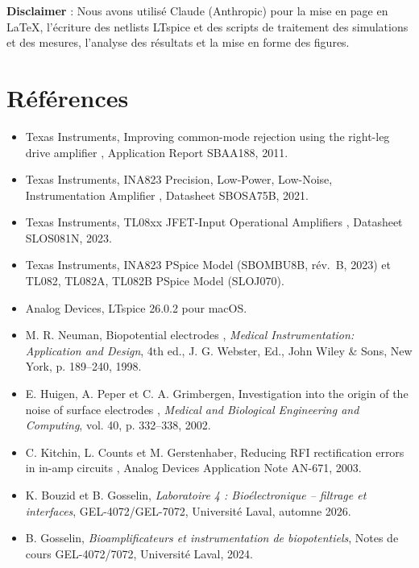 \documentclass[11pt,letterpaper]{article}
\begin{document}
\FloatBarrier
\bigskip
{\small\noindent\textbf{Disclaimer} : Nous avons utilisé Claude (Anthropic) pour la mise en page en \LaTeX{}, l'écriture des netlists LTspice et des scripts de traitement des simulations et des mesures, l'analyse des résultats et la mise en forme des figures.}

\section*{Références}
\begin{itemize}\sloppy
\item Texas Instruments, \og  Improving common-mode rejection using the right-leg drive amplifier \fg{}, Application Report SBAA188, 2011.
\item Texas Instruments, \og  INA823 Precision, Low-Power, Low-Noise, Instrumentation Amplifier \fg{}, Datasheet SBOSA75B, 2021.
\item Texas Instruments, \og  TL08xx JFET-Input Operational Amplifiers \fg{}, Datasheet SLOS081N, 2023.
\item Texas Instruments, \og  INA823 PSpice Model \fg{} (SBOMBU8B, rév.~B, 2023) et \og  TL082, TL082A, TL082B PSpice Model \fg{} (SLOJ070).
\item Analog Devices, LTspice 26.0.2 pour macOS.
\item M. R. Neuman, \og  Biopotential electrodes \fg{}, \emph{Medical Instrumentation: Application and Design}, 4th ed., J. G. Webster, Ed., John Wiley \& Sons, New York, p. 189--240, 1998.
\item E. Huigen, A. Peper et C. A. Grimbergen, \og  Investigation into the origin of the noise of surface electrodes \fg{}, \emph{Medical and Biological Engineering and Computing}, vol. 40, p. 332--338, 2002.
\item C. Kitchin, L. Counts et M. Gerstenhaber, \og  Reducing RFI rectification errors in in-amp circuits \fg{}, Analog Devices Application Note AN-671, 2003.
\item K. Bouzid et B. Gosselin, \emph{Laboratoire 4 : Bioélectronique -- filtrage et interfaces}, GEL-4072/GEL-7072, Université Laval, automne 2026.
\item B. Gosselin, \emph{Bioamplificateurs et instrumentation de biopotentiels}, Notes de cours GEL-4072/7072, Université Laval, 2024.
\end{itemize}
\end{document}
